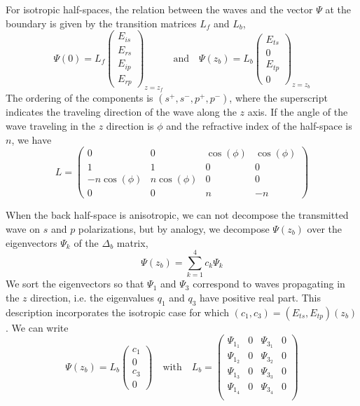 For isotropic half-spaces, the relation between the waves and the vector $\Psi$ at the boundary is given by the transition matrices $L_f$ and $L_b$,
$$
\Psi(0) = L_f 
\begin{pmatrix}
E_{is}\\
E_{rs}\\
E_{ip}\\
E_{rp}
\end{pmatrix}_{z=z_f}
\quad\mathrm{and} \quad 
\Psi(z_b) = L_b
\begin{pmatrix}
E_{ts}\\
0 \\
E_{tp}\\
0
\end{pmatrix}_{z=z_b}
$$
The ordering of the components is $(s^+,s^-,p^+,p^-)$, where the superscript indicates the traveling direction of the wave along the $z$ axis.
If the angle of the wave traveling in the $z$ direction is $\phi$ and the refractive index of the half-space is $n$, we have
$$
L = 
\begin{pmatrix}
0 & 0 & \cos(\phi) & \cos(\phi) \\
1 & 1 & 0 & 0 \\
-n \cos(\phi) & n \cos(\phi) & 0 & 0 \\
0 & 0 & n & -n 
\end{pmatrix}
$$

When the back half-space is anisotropic, we can not decompose the transmitted wave on $s$ and $p$ polarizations, but by analogy, we decompose $\Psi(z_b)$ over the eigenvectors $\Psi_k$ of the $\Delta_b$ matrix, 
$$
\Psi(z_b)= \sum_{k=1}^4 c_k \Psi_k
$$
We sort the eigenvectors so that $\Psi_1$ and $\Psi_3$ correspond to waves propagating in the $z$ direction, i.e. the eigenvalues $q_1$ and $q_3$ have positive real part.
This description incorporates the isotropic case for which $(c_1,c_3) = (E_{ts}, E_{tp})(z_b)$.
We can write 
$$
\Psi(z_b) = L_b
\begin{pmatrix}
c_1\\
0 \\
c_3\\
0
\end{pmatrix}
\quad\mathrm{with}\quad
L_b =
\begin{pmatrix} 
\Psi_{1_1} & 0 & \Psi_{3_1} & 0 \\ 
\Psi_{1_2} & 0 & \Psi_{3_2} & 0 \\ 
\Psi_{1_3} & 0 & \Psi_{3_3} & 0 \\ 
\Psi_{1_4} & 0 & \Psi_{3_4} & 0 \\ 
\end{pmatrix}
$$

